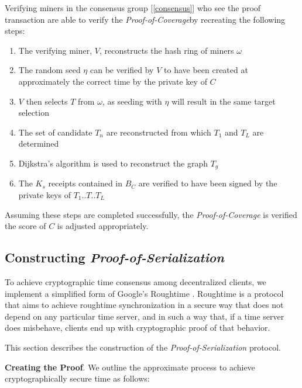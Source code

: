 \documentclass[10pt, nonatbib, nocopyrightspace, reprint]{sigplanconf}
\newcommand{\secref}[1]{[\autoref{#1}]}
\begin{document}
Verifying miners in the consensus group \secref{consensus} who see the proof transaction are able to verify the \emph{Proof-of-Coverage}by recreating the following steps:

\begin{enumerate}
        \item The verifying miner, $V$, reconstructs the hash ring of miners $\omega$
        \item The random seed $\eta$ can be verified by $V$ to have been created at approximately the correct time by the private key of $C$
        \item $V$ then selects $T$ from $\omega$, as seeding with $\eta$ will result in the same target selection
        \item The set of candidate $T_n$ are reconstructed from which $T_1$ and $T_L$ are determined
        \item Dijkstra's algorithm is used to reconstruct the graph $T_g$
        \item The $K_s$ receipts contained in $B_C$ are verified to have been signed by the private keys of $T_1$..$T$..$T_L$
\end{enumerate}

Assuming these steps are completed successfully, the \emph{Proof-of-Coverage} is verified the score of $C$ is adjusted appropriately.

\subsection{Constructing \emph{Proof-of-Serialization}}

To achieve cryptographic time consensus among decentralized clients, we implement a simplified form of Google's Roughtime \cite{roughtime}. Roughtime is a protocol that aims to achieve roughtime synchronization in a secure way that does not depend on any particular time server, and in such a way that, if a time server does misbehave, clients end up with cryptographic proof of that behavior.

This section describes the construction of the \emph{Proof-of-Serialization} protocol.

\textbf{Creating the Proof}. We outline the approximate process to achieve cryptographically secure time as follows:
\end{document}
